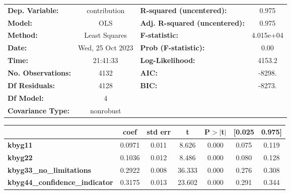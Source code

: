 \begin{center}
\begin{tabular}{lclc}
\toprule
\textbf{Dep. Variable:}                &   contribution   & \textbf{  R-squared (uncentered):}      &     0.975   \\
\textbf{Model:}                        &       OLS        & \textbf{  Adj. R-squared (uncentered):} &     0.975   \\
\textbf{Method:}                       &  Least Squares   & \textbf{  F-statistic:       }          & 4.015e+04   \\
\textbf{Date:}                         & Wed, 25 Oct 2023 & \textbf{  Prob (F-statistic):}          &     0.00    \\
\textbf{Time:}                         &     21:41:33     & \textbf{  Log-Likelihood:    }          &    4153.2   \\
\textbf{No. Observations:}             &        4132      & \textbf{  AIC:               }          &    -8298.   \\
\textbf{Df Residuals:}                 &        4128      & \textbf{  BIC:               }          &    -8273.   \\
\textbf{Df Model:}                     &           4      & \textbf{                     }          &             \\
\textbf{Covariance Type:}              &    nonrobust     & \textbf{                     }          &             \\
\bottomrule
\end{tabular}
\begin{tabular}{lcccccc}
                                       & \textbf{coef} & \textbf{std err} & \textbf{t} & \textbf{P$> |$t$|$} & \textbf{[0.025} & \textbf{0.975]}  \\
\midrule
\textbf{kbyg11}                        &       0.0971  &        0.011     &     8.626  &         0.000        &        0.075    &        0.119     \\
\textbf{kbyg22}                        &       0.1036  &        0.012     &     8.486  &         0.000        &        0.080    &        0.128     \\
\textbf{kbyg33\_no\_limitations}       &       0.2922  &        0.008     &    36.333  &         0.000        &        0.276    &        0.308     \\
\textbf{kbyg44\_confidence\_indicator} &       0.3175  &        0.013     &    23.602  &         0.000        &        0.291    &        0.344     \\

\end{tabular}
\end{center}
